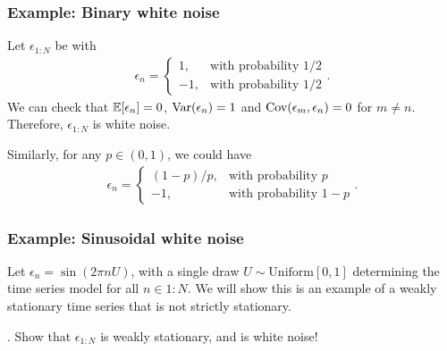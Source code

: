\begin{frame}[fragile]

\frametitle{Example: Binary white noise}

Let $\epsilon_{1:N}$ be {\iid} with
\begin{eqnarray}
\nonumber
\epsilon_n = \left\{\begin{array}{ll}
  1, & \mbox{with probability $1/2$} \\
  -1, & \mbox{with probability $1/2$} \end{array}\right. .
\end{eqnarray}
We can check that $\mathbb{E}[\epsilon_n]=0$, $\mathrm{Var}(\epsilon_n)=1$ and $\mathrm{Cov}(\epsilon_m,\epsilon_n)=0$ for $m\neq n$. Therefore, $\epsilon_{1:N}$ is white noise. 

Similarly, for any $p\in (0,1)$, we could have 
\begin{eqnarray}
\nonumber
\epsilon_n = \left\{\begin{array}{ll}
  (1-p)/p, & \mbox{with probability $p$} \\
  -1, & \mbox{with probability $1-p$} \end{array}\right. .
\end{eqnarray}

\end{frame} 

\begin{frame}[fragile]

\frametitle{Example: Sinusoidal white noise}


Let $\epsilon_n = \sin(2\pi n U)$, with a single draw $U\sim\mathrm{Uniform}[0,1]$ determining the time series model for all $n\in 1:N$. We will show this is an example of a weakly stationary time series that is not strictly stationary.

\vspace{2mm}

{\myquestion}. Show that $\epsilon_{1:N}$ is weakly stationary, and is white noise!



\end{frame}

